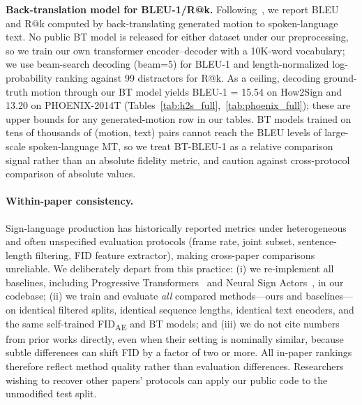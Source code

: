 \documentclass{article}
\begin{document}
\textbf{Back-translation model for BLEU-1/R@k.} Following~\citet{baltatzis2024neural}, we report BLEU and R@k computed by back-translating generated motion to spoken-language text. No public BT model is released for either dataset under our preprocessing, so we train our own transformer encoder--decoder with a 10K-word vocabulary; we use beam-search decoding (beam=5) for BLEU-1 and length-normalized log-probability ranking against 99 distractors for R@k. As a ceiling, decoding ground-truth motion through our BT model yields BLEU-1 = 15.54 on How2Sign and 13.20 on PHOENIX-2014T (Tables~\ref{tab:h2s_full},~\ref{tab:phoenix_full}); these are upper bounds for any generated-motion row in our tables. BT models trained on tens of thousands of (motion, text) pairs cannot reach the BLEU levels of large-scale spoken-language MT, so we treat BT-BLEU-1 as a relative comparison signal rather than an absolute fidelity metric, and caution against cross-protocol comparison of absolute values.

\paragraph{Within-paper consistency.}
Sign-language production has historically reported metrics under heterogeneous and often unspecified evaluation protocols (frame rate, joint subset, sentence-length filtering, FID feature extractor), making cross-paper comparisons unreliable. We deliberately depart from this practice: (i) we re-implement all baselines, including Progressive Transformers~\citep{saunders2020progressive} and Neural Sign Actors~\citep{baltatzis2024neural}, in our codebase; (ii) we train and evaluate \emph{all} compared methods---ours and baselines---on identical filtered splits, identical sequence lengths, identical text encoders, and the same self-trained FID\textsubscript{AE} and BT models; and (iii) we do not cite numbers from prior works directly, even when their setting is nominally similar, because subtle differences can shift FID by a factor of two or more. All in-paper rankings therefore reflect method quality rather than evaluation differences. Researchers wishing to recover other papers' protocols can apply our public code to the unmodified test split.
\end{document}
